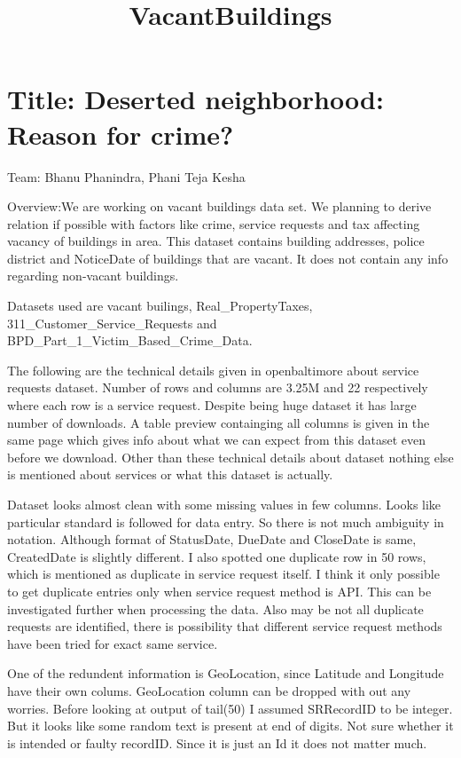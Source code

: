 \documentclass[11pt]{article}
\title{VacantBuildings}
\begin{document}
    
    
    \maketitle
    
    

    
    \section{Title: Deserted neighborhood: Reason for
crime?}\label{title-deserted-neighborhood-reason-for-crime}

Team: Bhanu Phanindra, Phani Teja Kesha

    Overview:We are working on vacant buildings data set. We planning to
derive relation if possible with factors like crime, service requests
and tax affecting vacancy of buildings in area. This dataset contains
building addresses, police district and NoticeDate of buildings that are
vacant. It does not contain any info regarding non-vacant buildings.

    Datasets used are vacant builings, Real\_PropertyTaxes,
311\_Customer\_Service\_Requests and
BPD\_Part\_1\_Victim\_Based\_Crime\_Data.

    The following are the technical details given in openbaltimore about
service requests dataset. Number of rows and columns are 3.25M and 22
respectively where each row is a service request. Despite being huge
dataset it has large number of downloads. A table preview containging
all columns is given in the same page which gives info about what we can
expect from this dataset even before we download. Other than these
technical details about dataset nothing else is mentioned about services
or what this dataset is actually.

    Dataset looks almost clean with some missing values in few columns.
Looks like particular standard is followed for data entry. So there is
not much ambiguity in notation. Although format of StatusDate, DueDate
and CloseDate is same, CreatedDate is slightly different. I also spotted
one duplicate row in 50 rows, which is mentioned as duplicate in service
request itself. I think it only possible to get duplicate entries only
when service request method is API. This can be investigated further
when processing the data. Also may be not all duplicate requests are
identified, there is possibility that different service request methods
have been tried for exact same service.

    One of the redundent information is GeoLocation, since Latitude and
Longitude have their own colums. GeoLocation column can be dropped with
out any worries. Before looking at output of tail(50) I assumed
SRRecordID to be integer. But it looks like some random text is present
at end of digits. Not sure whether it is intended or faulty recordID.
Since it is just an Id it does not matter much.
\end{document}

